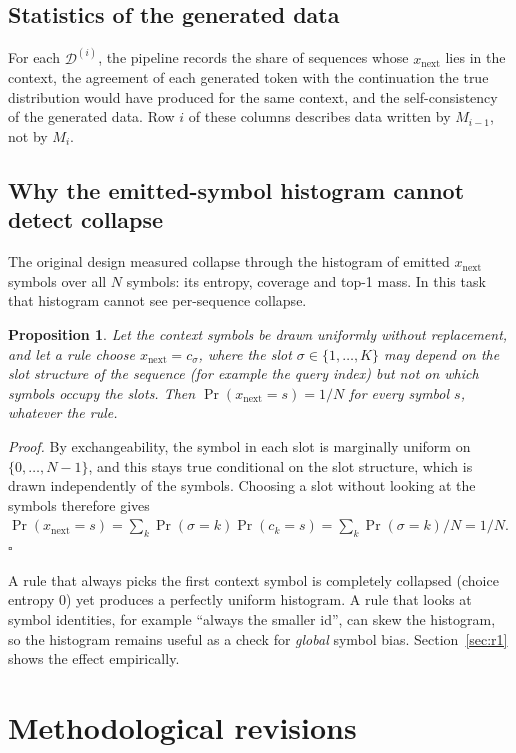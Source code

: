 \documentclass[11pt,a4paper]{article}
\newtheorem{proposition}{Proposition}
\newcommand{\xnext}{x_{\mathrm{next}}}
\newcommand{\data}[1]{\mathcal{D}^{(#1)}}
\begin{document}
\subsection{Statistics of the generated data}
For each $\data{i}$, the pipeline records the share of sequences whose $\xnext$
lies in the context, the agreement of each generated token with the
continuation the true distribution would have produced for the same context,
and the self-consistency of the generated data. Row $i$ of these columns
describes data written by $M_{i-1}$, not by $M_i$.

\subsection{Why the emitted-symbol histogram cannot detect collapse}\label{sec:blind}
The original design measured collapse through the histogram of emitted
$\xnext$ symbols over all $N$ symbols: its entropy, coverage and top-1 mass.
In this task that histogram cannot see per-sequence collapse.

\begin{proposition}\label{prop:marginal}
Let the context symbols be drawn uniformly without replacement, and let a rule
choose $\xnext=c_{\sigma}$, where the slot $\sigma\in\{1,\dots,K\}$ may depend
on the slot structure of the sequence (for example the query index) but not
on which symbols occupy the slots. Then $\Pr(\xnext=s)=1/N$ for every symbol
$s$, whatever the rule.
\end{proposition}

\noindent\emph{Proof.} By exchangeability, the symbol in each slot is
marginally uniform on $\{0,\dots,N-1\}$, and this stays true conditional on
the slot structure, which is drawn independently of the symbols. Choosing a
slot without looking at the symbols therefore gives
$\Pr(\xnext=s)=\sum_k\Pr(\sigma=k)\Pr(c_k=s)=\sum_k\Pr(\sigma=k)/N=1/N$.\hfill$\square$

\smallskip
A rule that always picks the first context symbol is completely collapsed
(choice entropy 0) yet produces a perfectly uniform histogram. A rule that
looks at symbol identities, for example ``always the smaller id'', can skew
the histogram, so the histogram remains useful as a check for \emph{global}
symbol bias. Section~\ref{sec:r1} shows the effect empirically.

\section{Methodological revisions}\label{sec:revisions}
\end{document}
